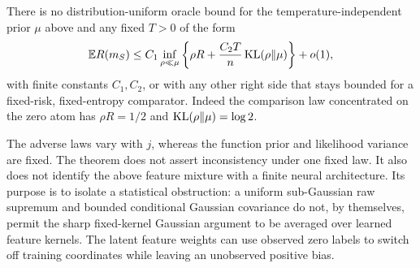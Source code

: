 \begin{corollary}
There is no distribution-uniform oracle bound for the temperature-independent prior $\mu$ above and any fixed $T>0$ of the form
\[
 \mathbb E R(m_S)\le C_1\inf_{\rho\ll\mu}
       \left\{\rho R+\frac{C_2T}{n}\operatorname{KL}(\rho\|\mu)\right\}+o(1),
\]
with finite constants $C_1,C_2$, or with any other right side that stays bounded for a fixed-risk, fixed-entropy comparator. Indeed the comparison law concentrated on the zero atom has $\rho R=1/2$ and $\operatorname{KL}(\rho\|\mu)=\log2$.
\end{corollary}

The adverse laws vary with $j$, whereas the function prior and likelihood variance are fixed. The theorem does not assert inconsistency under one fixed law. It also does not identify the above feature mixture with a finite neural architecture. Its purpose is to isolate a statistical obstruction: a uniform sub-Gaussian raw supremum and bounded conditional Gaussian covariance do not, by themselves, permit the sharp fixed-kernel Gaussian argument to be averaged over learned feature kernels. The latent feature weights can use observed zero labels to switch off training coordinates while leaving an unobserved positive bias.
